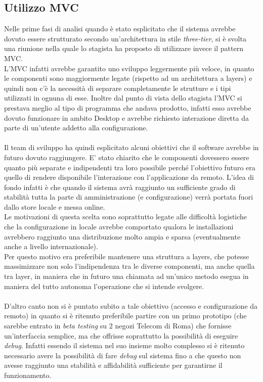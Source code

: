 \documentclass[a4paper,13pt,twoside]{article}
\begin{document}
\subsection{Utilizzo MVC} \label{sec:mvc}
Nelle prime fasi di analisi quando è stato esplicitato che il sistema avrebbe dovuto essere strutturato secondo un'architettura in stile \textit{three-tier}, si è svolta una riunione nella quale lo stagista ha proposto di utilizzare invece il pattern MVC. \\
L'MVC infatti avrebbe garantito uno sviluppo leggermente più veloce, in quanto le componenti sono maggiormente legate (rispetto ad un architettura a layers) e quindi non c'è la necessità di separare completamente le strutture e i tipi utilizzati in ognuna di esse. Inoltre dal punto di vista dello stagista l'MVC si prestava meglio al tipo di programma che andava prodotto, infatti esso avrebbe dovuto funzionare  in ambito Desktop e avrebbe richiesto interazione diretta da parte di un'utente addetto alla configurazione. \\ \\
Il team di sviluppo ha quindi esplicitato alcuni obiettivi che il software avrebbe in futuro dovuto raggiungere. E' stato chiarito che le componenti dovessero essere quanto più separate e indipendenti tra loro possibile perché l'obiettivo futuro era quello di rendere disponibile l'interazione con l'applicazione da remoto. L'idea di fondo infatti è che quando il sistema avrà raggiunto un sufficiente grado di stabilità tutta la parte di amministrazione (e configurazione) verrà portata fuori dallo store locale e messa online. \\
Le motivazioni di questa scelta sono soprattutto legate alle difficoltà logistiche che la configurazione in locale avrebbe comportato qualora le installazioni avrebbero raggiunto una distribuzione molto ampia e sparsa (eventualmente anche a livello internazionale). \\ 
Per questo motivo era preferibile mantenere una struttura a layers, che potesse massimizzare non solo l'indipendenza tra le diverse componenti, ma anche quella tra layer, in maniera che in futuro una chiamata ad un'unico metodo esegua in maniera del tutto autonoma l'operazione che si intende svolgere. \\ \\
D'altro canto non si è puntato subito a tale obiettivo (accesso e configurazione da remoto) in quanto si è ritenuto preferibile partire con un primo prototipo (che sarebbe entrato in \textit{beta testing} su 2 negozi Telecom di Roma) che fornisse un'interfaccia semplice, ma che offrisse soprattutto la possibilità di eseguire \textit{debug}. Infatti essendo il sistema nel suo insieme molto complesso si è ritenuto necessario avere la possibilità di fare \textit{debug} sul sistema fino a che questo non avesse raggiunto una stabilità e affidabilità sufficiente per garantirne il funzionamento.
\end{document}

